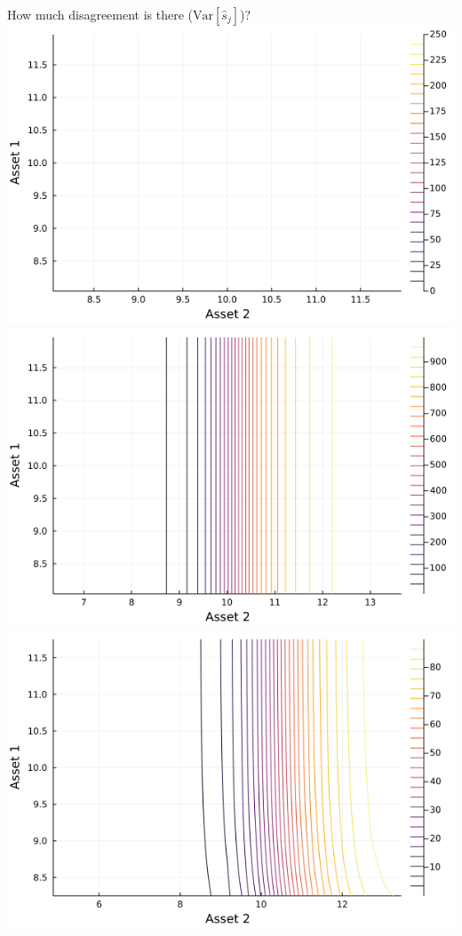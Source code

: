 \documentclass[
  ignorenonframetext,
]{beamer}
\begin{document}
\begin{frame}{How much disagreement is there
(\(\text{Var}[\hat s_j]\))?}
\protect\hypertarget{how-much-disagreement-is-there-textvarhat-s_j}{}
\includegraphics[width=0.4\paperheight]{complexity_files/figure-beamer/unnamed-chunk-17-1}
\includegraphics[width=0.4\paperheight]{complexity_files/figure-beamer/unnamed-chunk-17-2}
\includegraphics[width=0.4\paperheight]{complexity_files/figure-beamer/unnamed-chunk-17-3}

\end{frame}
\end{document}
